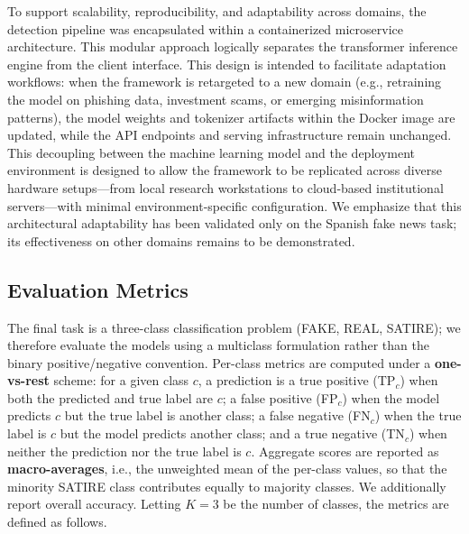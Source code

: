 \documentclass[informatics,article,submit,pdftex,moreauthors]{Definitions/mdpi}
\begin{document}
To support scalability, reproducibility, and adaptability across domains, the detection pipeline was encapsulated within a containerized microservice architecture. This modular approach logically separates the transformer inference engine from the client interface. This design is intended to facilitate adaptation workflows: when the framework is retargeted to a new domain (e.g., retraining the model on phishing data, investment scams, or emerging misinformation patterns), the model weights and tokenizer artifacts within the Docker image are updated, while the API endpoints and serving infrastructure remain unchanged. This decoupling between the machine learning model and the deployment environment is designed to allow the framework to be replicated across diverse hardware setups—from local research workstations to cloud-based institutional servers—with minimal environment-specific configuration. We emphasize that this architectural adaptability has been validated only on the Spanish fake news task; its effectiveness on other domains remains to be demonstrated.

\subsection{Evaluation Metrics}
The final task is a three-class classification problem (FAKE, REAL, SATIRE); we therefore evaluate the models using a multiclass formulation rather than the binary positive/negative convention. Per-class metrics are computed under a \textbf{one-vs-rest} scheme: for a given class $c$, a prediction is a true positive (TP$_c$) when both the predicted and true label are $c$; a false positive (FP$_c$) when the model predicts $c$ but the true label is another class; a false negative (FN$_c$) when the true label is $c$ but the model predicts another class; and a true negative (TN$_c$) when neither the prediction nor the true label is $c$. Aggregate scores are reported as \textbf{macro-averages}, i.e., the unweighted mean of the per-class values, so that the minority SATIRE class contributes equally to majority classes. We additionally report overall accuracy. Letting $K=3$ be the number of classes, the metrics are defined as follows.
\end{document}
